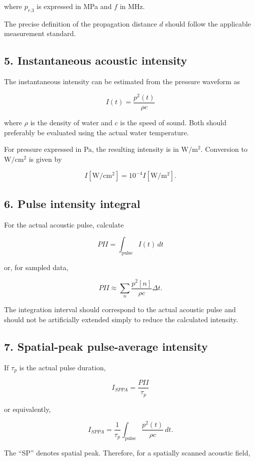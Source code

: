 \documentclass[11pt,a4paper]{article}
\begin{document}
where \(p_{r.3}\) is expressed in MPa and \(f\) in MHz.

The precise definition of the propagation distance \(d\) should follow the
applicable measurement standard.

\subsection*{5. Instantaneous acoustic intensity}

The instantaneous intensity can be estimated from the pressure waveform as

\[
\boxed{
I(t)=\frac{p^2(t)}{\rho c}
}
\]

where \(\rho\) is the density of water and \(c\) is the speed of sound.
Both should preferably be evaluated using the actual water temperature.

For pressure expressed in Pa, the resulting intensity is in
\(\mathrm{W/m^2}\). Conversion to \(\mathrm{W/cm^2}\) is given by

\[
I[\mathrm{W/cm^2}]
=
10^{-4} I[\mathrm{W/m^2}].
\]

\subsection*{6. Pulse intensity integral}

For the actual acoustic pulse, calculate

\[
\boxed{
PII
=
\int_{\mathrm{pulse}} I(t)\,dt
}
\]

or, for sampled data,

\[
\boxed{
PII
\approx
\sum_n
\frac{p^2[n]}{\rho c}\Delta t.
}
\]

The integration interval should correspond to the actual acoustic pulse and
should not be artificially extended simply to reduce the calculated
intensity.

\subsection*{7. Spatial-peak pulse-average intensity}

If \(\tau_p\) is the actual pulse duration,

\[
\boxed{
I_{SPPA}
=
\frac{PII}{\tau_p}
}
\]

or equivalently,

\[
\boxed{
I_{SPPA}
=
\frac{1}{\tau_p}
\int_{\mathrm{pulse}}
\frac{p^2(t)}{\rho c}\,dt.
}
\]

The ``SP'' denotes spatial peak. Therefore, for a spatially scanned
acoustic field,
\end{document}
